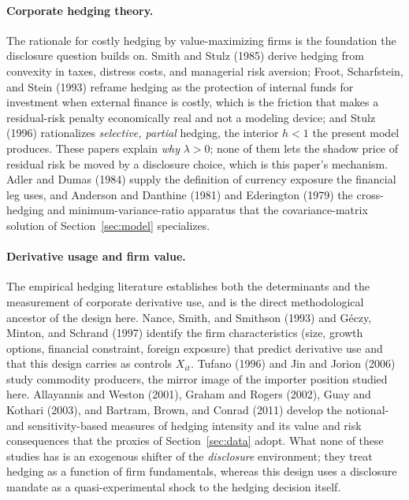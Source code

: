 \documentclass[11pt,a4paper]{article}
\begin{document}
\paragraph{Corporate hedging theory.} The rationale for costly hedging by value-maximizing firms is the foundation the disclosure question builds on. Smith and Stulz (1985) derive hedging from convexity in taxes, distress costs, and managerial risk aversion; Froot, Scharfstein, and Stein (1993) reframe hedging as the protection of internal funds for investment when external finance is costly, which is the friction that makes a residual-risk penalty economically real and not a modeling device; and Stulz (1996) rationalizes \emph{selective, partial} hedging, the interior $h<1$ the present model produces. These papers explain \emph{why} $\lambda>0$; none of them lets the shadow price of residual risk be moved by a disclosure choice, which is this paper's mechanism. Adler and Dumas (1984) supply the definition of currency exposure the financial leg uses, and Anderson and Danthine (1981) and Ederington (1979) the cross-hedging and minimum-variance-ratio apparatus that the covariance-matrix solution of Section~\ref{sec:model} specializes.

\paragraph{Derivative usage and firm value.} The empirical hedging literature establishes both the determinants and the measurement of corporate derivative use, and is the direct methodological ancestor of the design here. Nance, Smith, and Smithson (1993) and G\'eczy, Minton, and Schrand (1997) identify the firm characteristics (size, growth options, financial constraint, foreign exposure) that predict derivative use and that this design carries as controls $X_{it}$. Tufano (1996) and Jin and Jorion (2006) study commodity producers, the mirror image of the importer position studied here. Allayannis and Weston (2001), Graham and Rogers (2002), Guay and Kothari (2003), and Bartram, Brown, and Conrad (2011) develop the notional- and sensitivity-based measures of hedging intensity and its value and risk consequences that the proxies of Section~\ref{sec:data} adopt. What none of these studies has is an exogenous shifter of the \emph{disclosure} environment; they treat hedging as a function of firm fundamentals, whereas this design uses a disclosure mandate as a quasi-experimental shock to the hedging decision itself.
\end{document}
